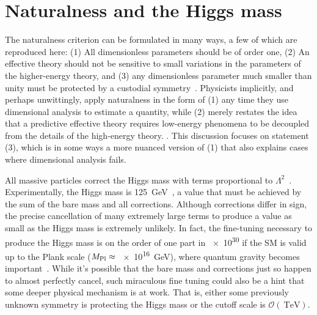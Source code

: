 \documentclass[12pt]{article}
\begin{document}
\section{Naturalness and the Higgs mass}
    The naturalness criterion can be formulated in many ways, a few of which are reproduced here: (1) All dimensionless parameters should be of order one, (2) An effective theory should not be sensitive to small variations in the parameters of the higher-energy theory, and (3) any dimensionless parameter much smaller than unity must be protected by a custodial symmetry~\cite{giudice_naturally, thooft_naturalness}. Physicists implicitly, and perhaps unwittingly, apply naturalness in the form of (1) any time they use dimensional analysis to estimate a quantity, while (2) merely restates the idea that a predictive effective theory requires low-energy phenomena to be decoupled from the details of the high-energy theory. . This discussion focuses on statement (3), which is in some ways a more nuanced version of (1) that also explains cases where dimensional analysis fails.

    All massive particles correct the Higgs mass with terms proportional to $\Lambda^2$~\cite{dine_naturalness}. Experimentally, the Higgs mass is \SI{125}{\giga\electronvolt}~\cite{cms_higgs, atlas_higgs}, a value that must be achieved by the sum of the bare mass and all corrections. Although corrections differ in sign, the precise cancellation of many extremely large terms to produce a value as small as the Higgs mass is extremely unlikely. In fact, the fine-tuning necessary to produce the Higgs mass is on the order of one part in \num{e30} if the SM is valid up to the Plank scale ($M_{\mathrm{Pl}}\approx$ \SI{e16}{\giga\electronvolt}), where quantum gravity becomes important~\cite{giudice_naturally}. While it's possible that the bare mass and corrections just so happen to almost perfectly cancel, such miraculous fine tuning could also be a hint that some deeper physical mechanism is at work. That is, either some previously unknown symmetry is protecting the Higgs mass or the cutoff scale is $\mathcal{O}\left(\SI{}{\tera\electronvolt}\right)$.
    
\end{document}
